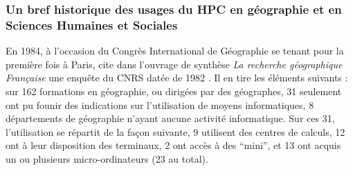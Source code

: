 


\subsubsection{Un bref historique des usages du HPC en géographie et en Sciences Humaines et Sociales}
\label{sssec:histo_centrecalcul}



En 1984, à l'occasion du Congrès International de Géographie se tenant pour la première fois à Paris, \textcite{Faugieres1984} cite dans l'ouvrage de synthèse \textit{La recherche géographique Française} une enquête du CNRS datée de 1982 . Il en tire les éléments suivants : sur 162 formations en géographie, ou dirigées par des géographes, 31 seulement ont pu founir des indications sur l'utilisation de moyens informatiques, 8 départements de géographie n'ayant aucune activité informatique. Sur ces 31, l'utilisation se répartit de la façon suivante, 9 utilisent des centres de calculs, 12 ont à leur disposition des terminaux, 2 ont accès à des \enquote{mini}, et 13 ont acquis un ou plusieurs micro-ordinateurs (23 au total).

